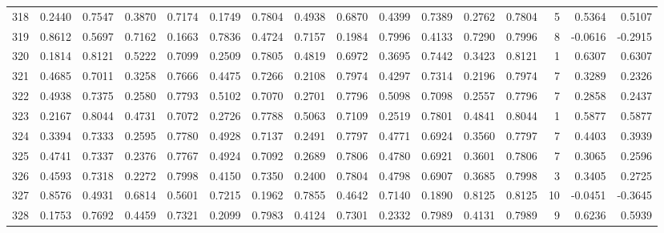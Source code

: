 \begin{tabular}{lrrrrrrrrrrrrrrr}
318 &      0.2440 &  0.7547 &  0.3870 &  0.7174 &  0.1749 &  0.7804 &  0.4938 &  0.6870 &  0.4399 &  0.7389 &   0.2762 &     0.7804 &      5 &                    0.5364 &                     0.5107 \\
319 &      0.8612 &  0.5697 &  0.7162 &  0.1663 &  0.7836 &  0.4724 &  0.7157 &  0.1984 &  0.7996 &  0.4133 &   0.7290 &     0.7996 &      8 &                   -0.0616 &                    -0.2915 \\
320 &      0.1814 &  0.8121 &  0.5222 &  0.7099 &  0.2509 &  0.7805 &  0.4819 &  0.6972 &  0.3695 &  0.7442 &   0.3423 &     0.8121 &      1 &                    0.6307 &                     0.6307 \\
321 &      0.4685 &  0.7011 &  0.3258 &  0.7666 &  0.4475 &  0.7266 &  0.2108 &  0.7974 &  0.4297 &  0.7314 &   0.2196 &     0.7974 &      7 &                    0.3289 &                     0.2326 \\
322 &      0.4938 &  0.7375 &  0.2580 &  0.7793 &  0.5102 &  0.7070 &  0.2701 &  0.7796 &  0.5098 &  0.7098 &   0.2557 &     0.7796 &      7 &                    0.2858 &                     0.2437 \\
323 &      0.2167 &  0.8044 &  0.4731 &  0.7072 &  0.2726 &  0.7788 &  0.5063 &  0.7109 &  0.2519 &  0.7801 &   0.4841 &     0.8044 &      1 &                    0.5877 &                     0.5877 \\
324 &      0.3394 &  0.7333 &  0.2595 &  0.7780 &  0.4928 &  0.7137 &  0.2491 &  0.7797 &  0.4771 &  0.6924 &   0.3560 &     0.7797 &      7 &                    0.4403 &                     0.3939 \\
325 &      0.4741 &  0.7337 &  0.2376 &  0.7767 &  0.4924 &  0.7092 &  0.2689 &  0.7806 &  0.4780 &  0.6921 &   0.3601 &     0.7806 &      7 &                    0.3065 &                     0.2596 \\
326 &      0.4593 &  0.7318 &  0.2272 &  0.7998 &  0.4150 &  0.7350 &  0.2400 &  0.7804 &  0.4798 &  0.6907 &   0.3685 &     0.7998 &      3 &                    0.3405 &                     0.2725 \\
327 &      0.8576 &  0.4931 &  0.6814 &  0.5601 &  0.7215 &  0.1962 &  0.7855 &  0.4642 &  0.7140 &  0.1890 &   0.8125 &     0.8125 &     10 &                   -0.0451 &                    -0.3645 \\
328 &      0.1753 &  0.7692 &  0.4459 &  0.7321 &  0.2099 &  0.7983 &  0.4124 &  0.7301 &  0.2332 &  0.7989 &   0.4131 &     0.7989 &      9 &                    0.6236 &                     0.5939 \\

\end{tabular}
